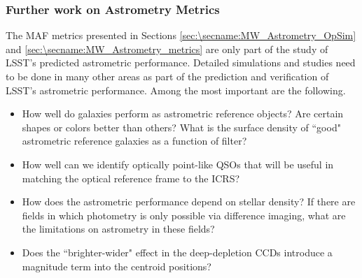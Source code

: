 

\subsubsection{Further work on Astrometry Metrics}

The MAF metrics presented in Sections \ref{sec:\secname:MW_Astrometry_OpSim} and \ref{sec:\secname:MW_Astrometry_metrics} are only part of the
study of LSST's predicted astrometric performance.  Detailed simulations
and studies need to be done in many other areas as part of the
prediction and verification of LSST's astrometric performance.  Among
the most important are the following.
\begin{itemize}
\item How well do galaxies perform as astrometric reference objects? Are certain shapes or colors better than others? What is the 
surface density of ``good" astrometric reference galaxies as a function of filter? 
\item How well can we identify optically point-like QSOs that will be useful in matching the optical reference frame to the ICRS?
\item How does the astrometric performance depend on stellar density? If there are fields in which photometry is only possible via difference imaging, what are the limitations
on astrometry in these fields?
\item Does the ``brighter-wider" effect in the deep-depletion CCDs introduce a magnitude term into the centroid positions?
\end{itemize}

\navigationbar

